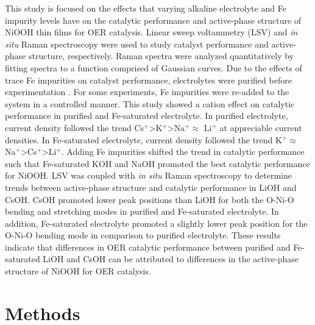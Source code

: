 \documentclass[journal=jpccck,manuscript=article,email=true]{achemso}
\begin{document}
This study is focused on the effects that varying alkaline electrolyte and Fe impurity levels have on the catalytic performance and active-phase structure of NiOOH thin films for OER catalysis. Linear sweep voltammetry (LSV) and \emph{in situ} Raman spectroscopy were used to study catalyst performance and active-phase structure, respectively. Raman spectra were analyzed quantitatively by fitting spectra to a function comprised of Gaussian curves. Due to the effects of trace Fe impurities on catalyst performance, electrolytes were purified before experimentation \cite{trotochaud-2014-nickel-iron}. For some experiments, Fe impurities were re-added to the system in a controlled manner. This study showed a cation effect on catalytic performance in purified and Fe-saturated electrolyte. In purified electrolyte, current density followed the trend Cs$^{\text{+}}$\textgreater K$^{\text{+}}$\textgreater Na$^{\text{+}}$$\approx$ Li$^{\text{+}}$ at appreciable current densities. In Fe-saturated electrolyte, current density followed the trend K$^{\text{+}}$$\approx$ Na$^{\text{+}}$\textgreater Cs$^{\text{+}}$\textgreater Li$^{\text{+}}$. Adding Fe impurities shifted the trend in catalytic performance such that Fe-saturated KOH and NaOH promoted the best catalytic performance for NiOOH. LSV was coupled with \emph{in situ} Raman spectroscopy to determine trends between active-phase structure and catalytic performance in LiOH and CsOH. CsOH promoted lower peak positions than LiOH for both the O-Ni-O bending and stretching modes in purified and Fe-saturated electrolyte. In addition, Fe-saturated electrolyte promoted a slightly lower peak position for the O-Ni-O bending mode in comparison to purified electrolyte. These results indicate that differences in OER catalytic performance between purified and Fe-saturated LiOH and CsOH can be attributed to differences in the active-phase structure of NiOOH for OER catalysis.

\section{Methods}
\label{sec-2}
\end{document}
